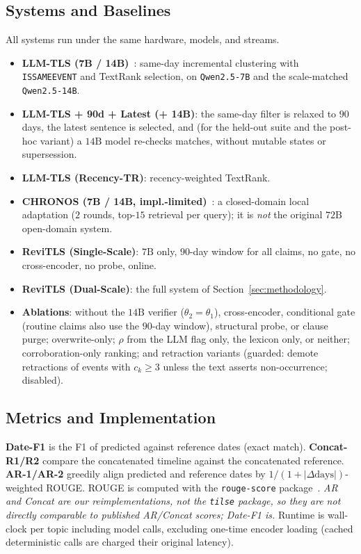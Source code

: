 \documentclass[journal]{IEEEtran}
\begin{document}
\subsection{Systems and Baselines}
\label{subsec:baselines}

All systems run under the same hardware, models, and streams.
\begin{itemize}
    \item \textbf{LLM-TLS (7B / 14B)}~\cite{hu2024moments}: same-day incremental clustering with \texttt{ISSAMEEVENT} and TextRank selection, on \texttt{Qwen2.5-7B} and the scale-matched \texttt{Qwen2.5-14B}.
    \item \textbf{LLM-TLS + 90d + Latest (+ 14B)}: the same-day filter is relaxed to $90$ days, the latest sentence is selected, and (for the held-out suite and the post-hoc variant) a $14\text{B}$ model re-checks matches, without mutable states or supersession.
    \item \textbf{LLM-TLS (Recency-TR)}: recency-weighted TextRank.
    \item \textbf{CHRONOS (7B / 14B, impl.-limited)}~\cite{wu2025unfolding}: a closed-domain local adaptation ($2$ rounds, top-$15$ retrieval per query); it is \emph{not} the original $72\text{B}$ open-domain system.
    \item \textbf{ReviTLS (Single-Scale)}: $7\text{B}$ only, $90$-day window for all claims, no gate, no cross-encoder, no probe, online.
    \item \textbf{ReviTLS (Dual-Scale)}: the full system of Section~\ref{sec:methodology}.
    \item \textbf{Ablations}: without the $14\text{B}$ verifier ($\theta_2=\theta_1$), cross-encoder, conditional gate (routine claims also use the $90$-day window), structural probe, or clause purge; overwrite-only; $\rho$ from the LLM flag only, the lexicon only, or neither; corroboration-only ranking; and retraction variants (guarded: demote retractions of events with $c_k\ge3$ unless the text asserts non-occurrence; disabled).
\end{itemize}

\subsection{Metrics and Implementation}
\label{subsec:metrics}

\textbf{Date-F1} is the F1 of predicted against reference dates (exact match). \textbf{Concat-R1/R2} compare the concatenated timeline against the concatenated reference. \textbf{AR-1/AR-2} greedily align predicted and reference dates by $1/(1+|\Delta\text{days}|)$-weighted ROUGE. ROUGE is computed with the \texttt{rouge-score} package~\cite{lin2004rouge}. \emph{AR and Concat are our reimplementations, not the \texttt{tilse} package, so they are not directly comparable to published AR/Concat scores; Date-F1 is.} Runtime is wall-clock per topic including model calls, excluding one-time encoder loading (cached deterministic calls are charged their original latency).
\end{document}
